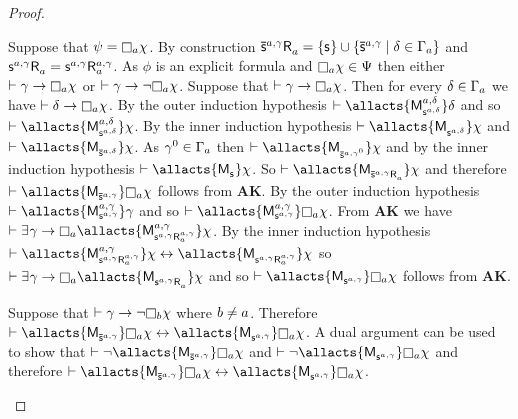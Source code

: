 \begin{proof}
\begin{enumerate}
            Suppose that $\psi = \necessary[\agentA] \chi$.
            By construction $\aPStateS[\agentA,\gamma] \aAccessibility{\agentA} = \{\aStateS\} \cup \{\aPStateS[\agentA,\gamma] \mid \delta \in \Gamma_\agentA\}$ and $\aStateS[\agentA,\gamma] \aAccessibility{\agentA} = \aStateS[\agentA,\gamma] \aAccessibility[\agentA,\gamma]{\agentA}$.
            As $\phi$ is an explicit formula and $\necessary[\agentA] \chi \in \Psi$ then either $\proves \gamma \implies \necessary[\agentA] \chi$ or $\proves \gamma \implies \neg \necessary[\agentA] \chi$.
            Suppose that $\proves \gamma \implies \necessary[\agentA] \chi$.
            Then for every $\delta \in \Gamma_a$ we have $\proves \delta \implies \necessary[\agentA] \chi$.
            By the outer induction hypothesis $\proves \allacts{\aPModel[\agentA,\delta]{\aStateS[\agentA,\delta]}} \delta$ and so $\proves \allacts{\aPModel[\agentA,\delta]{\aStateS[\agentA,\delta]}} \chi$.
            By the inner induction hypothesis $\proves \allacts{\aPModel{\aStateS[\agentA,\delta]}} \chi$ and $\proves \allacts{\aPModel{\aPStateS[\agentA,\delta]}} \chi$.
            As $\gamma^0 \in \Gamma_a$ then $\proves \allacts{\aPModel{\aPStateS[\agentA,\gamma^0]}} \chi$ and by the inner induction hypothesis $\proves \allacts{\aPModel{\aStateS}} \chi$.
            So $\proves \allacts{\aPModel{\aPStateS[\agentA,\gamma] \aAccessibility{\agentA}}} \chi$ and therefore $\proves \allacts{\aPModel{\aPStateS[\agentA,\gamma]}} \necessary[\agentA] \chi$ follows from {\bf AK}.
            By the outer induction hypothesis $\proves \allacts{\aPModel[\agentA,\gamma]{\aStateS[\agentA,\gamma]}} \gamma$ and so $\proves \allacts{\aPModel[\agentA,\gamma]{\aStateS[\agentA,\gamma]}} \necessary[\agentA] \chi$.
            From {\bf AK} we have $\proves \somerefs \gamma \implies \necessary[\agentA] \allacts{\aPModel[\agentA,\gamma]{\aStateS[\agentA,\gamma] \aAccessibility[\agentA,\gamma]{\agentA}}} \chi$.
            By the inner induction hypothesis $\proves \allacts{\aPModel[\agentA,\gamma]{\aStateS[\agentA,\gamma] \aAccessibility[\agentA,\gamma]{\agentA}}} \chi \iff \allacts{\aPModel{\aStateS[\agentA,\gamma] \aAccessibility[\agentA,\gamma]{\agentA}}} \chi$ so $\proves \somerefs \gamma \implies \necessary[\agentA] \allacts{\aPModel{\aStateS[\agentA,\gamma] \aAccessibility{\agentA}}} \chi$ and so $\proves \allacts{\aPModel{\aStateS[\agentA,\gamma]}} \necessary[\agentA] \chi$ follows from {\bf AK}.

            Suppose that $\proves \gamma \implies \neg \necessary[\agentB] \chi$ where $b \neq a$.
            Therefore $\proves \allacts{\aPModel{\aPStateS[\agentA,\gamma]}} \necessary[\agentA] \chi \iff \allacts{\aPModel{\aStateS[\agentA,\gamma]}} \necessary[\agentA] \chi$.
            A dual argument can be used to show that $\proves \neg \allacts{\aPModel{\aPStateS[\agentA,\gamma]}} \necessary[\agentA] \chi$ and $\proves \neg \allacts{\aPModel{\aStateS[\agentA,\gamma]}} \necessary[\agentA] \chi$ and therefore $\proves \allacts{\aPModel{\aPStateS[\agentA,\gamma]}} \necessary[\agentA] \chi \iff \allacts{\aPModel{\aStateS[\agentA,\gamma]}} \necessary[\agentA] \chi$.


\end{enumerate}
\end{proof}

